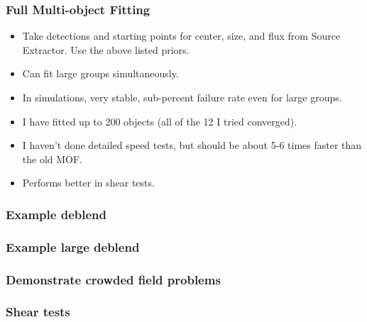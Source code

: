 \documentclass{beamer}
\newcommand{\mcal}{\textsc{metacalibration}}
\begin{document}
\frame
{
    \frametitle{Full Multi-object Fitting}

    \begin{itemize}

        \item Take detections and starting points for
            center, size, and flux from Source Extractor.  Use the
            above listed priors.
            
        \item Can fit large groups simultaneously.

        \item In simulations, very stable, sub-percent failure rate
            even for large groups.

        \item I have fitted up to 200 objects (all of the 12 I tried converged).

        \item I haven't done detailed speed tests, but should be
            about 5-6 times faster than the old MOF.

        \item Performs better in shear tests.

    \end{itemize}

}

\frame
{
    \frametitle{Example deblend}

}

\frame
{
    \frametitle{Example large deblend}

}

\frame
{
    \frametitle{Demonstrate crowded field problems}

}

\frame
{
    \frametitle{Shear tests}

}



\end{document}
